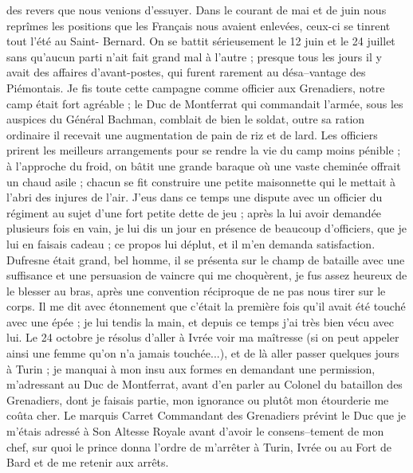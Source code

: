 \documentclass[12pt]{article}
\begin{document}
 des revers que nous venions d’essuyer. Dans le courant
de mai et de juin nous reprîmes les positions que les Français nous avaient enlevées, ceux-ci se
tinrent tout l’été au Saint- Bernard. On se battit sérieusement le 12 juin et le 24 juillet sans
qu’aucun parti n’ait fait grand mal à l’autre ; presque tous les jours il y avait des affaires
d’avant-postes, qui furent rarement au désa–vantage des Piémontais. Je fis toute cette campagne
comme officier aux Grenadiers, notre camp était fort agréable ; le Duc de Montferrat qui commandait
l’armée, sous les auspices du Général Bachman, comblait de bien le soldat, outre sa ration ordinaire
il recevait une augmentation de pain de riz et de lard. Les officiers prirent les meilleurs
arrangements pour se rendre la vie du camp moins pénible ; à l’approche du froid, on bâtit une
grande baraque où une vaste cheminée offrait un chaud asile ; chacun se fit construire une petite
maisonnette qui le mettait à l’abri des injures de l’air. J’eus dans ce temps une dispute avec un
officier du régiment au sujet d’une fort petite dette de jeu ; après la lui avoir demandée plusieurs
fois en vain, je lui dis un jour en présence de beaucoup d’officiers, que je lui en faisais cadeau ;
ce propos lui déplut, et il m’en demanda satisfaction. Dufresne était grand, bel homme, il se
présenta sur le champ de bataille avec une suffisance et une persuasion de vaincre qui me
choquèrent, je fus assez heureux de le blesser au bras, après une convention réciproque de ne pas
nous tirer sur le corps. Il me dit avec étonnement que c’était la première fois qu’il avait été
touché avec une épée ; je lui tendis la main, et depuis ce temps j’ai très bien vécu avec lui. Le 24
octobre je résolus d’aller à Ivrée voir ma maîtresse (si on peut appeler ainsi une femme qu’on n’a
jamais touchée...), et de là aller passer quelques jours à Turin ; je manquai à mon insu aux formes
en demandant une permission, m’adressant au Duc de Montferrat, avant d’en parler au Colonel du
bataillon des Grenadiers, dont je faisais partie, mon ignorance ou plutôt mon étourderie me coûta
cher. Le marquis Carret Commandant des Grenadiers prévint le Duc que je m’étais adressé à Son
Altesse Royale avant d’avoir le consens–tement de mon chef, sur quoi le prince donna l’ordre de
m’arrêter à Turin, Ivrée ou au Fort de Bard et de me retenir aux arrêts.
\end{document}
